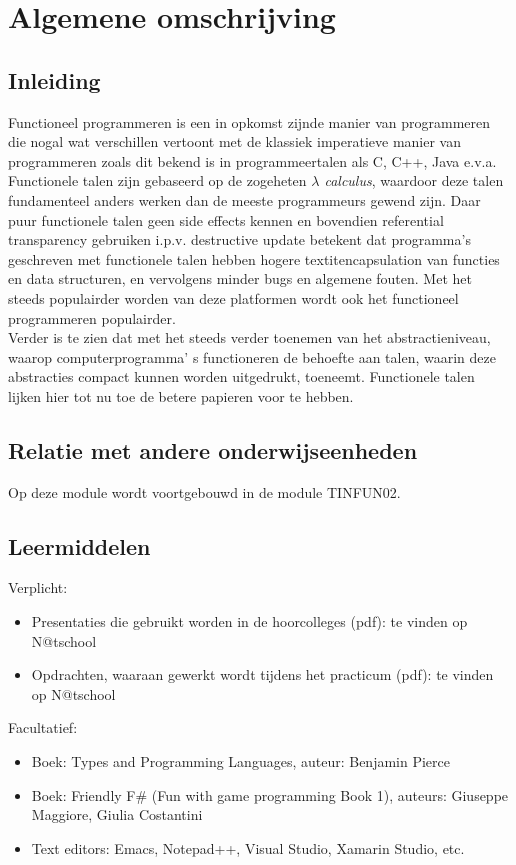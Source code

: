 \section{Algemene omschrijving}
	\subsection{Inleiding}
		Functioneel programmeren is een in opkomst zijnde manier van programmeren die nogal wat verschillen vertoont met de klassiek imperatieve manier van programmeren zoals dit bekend is in programmeertalen als C, C++, Java e.v.a. \\ 

		Functionele talen zijn gebaseerd op de zogeheten \emph{$\lambda$ calculus}, waardoor deze talen fundamenteel anders werken dan de meeste programmeurs gewend zijn. Daar puur functionele talen geen side effects kennen en bovendien referential transparency gebruiken i.p.v. destructive update betekent dat programma's geschreven met functionele talen hebben hogere textit{encapsulation} van functies en data structuren, en vervolgens minder bugs en algemene fouten. Met het steeds populairder worden van deze platformen wordt ook het functioneel programmeren populairder. \\

		Verder is te zien dat met het steeds verder toenemen van het abstractieniveau, waarop computerprogramma' s functioneren de behoefte aan talen, waarin deze abstracties compact kunnen worden uitgedrukt, toeneemt. Functionele talen lijken hier tot nu toe de betere papieren voor te hebben.\\

	\subsection{Relatie met andere onderwijseenheden}
		Op deze module wordt voortgebouwd in de module TINFUN02. \\
	\subsection{Leermiddelen}
		Verplicht:
		\begin{itemize}
			\item Presentaties die gebruikt worden in de hoorcolleges (pdf): te vinden op N@tschool
			\item Opdrachten, waaraan gewerkt wordt tijdens het practicum (pdf): te vinden op N@tschool
		\end{itemize}
		Facultatief:
		\begin{itemize}
			\item Boek: Types and Programming Languages, auteur: Benjamin Pierce
			\item Boek: Friendly F\# (Fun with game programming Book 1), auteurs: Giuseppe Maggiore, Giulia Costantini
			\item Text editors: Emacs, Notepad++, Visual Studio, Xamarin Studio, etc.
		\end{itemize}